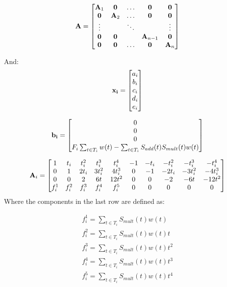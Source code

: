 \documentclass{article}
\begin{document}
\begin{equation*}
    \mathbf{A} = \begin{bmatrix}
        \mathbf{A}_1 & \mathbf{0} & \hdots & \mathbf{0} & \mathbf{0} \\
        \mathbf{0} & \mathbf{A}_2 & \hdots & \mathbf{0} & \mathbf{0} \\
        \vdots & & \ddots & & \vdots \\
        \mathbf{0} & \mathbf{0} & & \mathbf{A}_{n-1} & \mathbf{0} \\
        \mathbf{0} & \mathbf{0} & \hdots & \mathbf{0} & \mathbf{A}_n
    \end{bmatrix}
\end{equation*}

And:
\begin{equation*}
    \mathbf{x_i} = \begin{bmatrix}
        a_i \\
        b_i \\
        c_i \\
        d_i \\
        e_i \\
    \end{bmatrix}
\end{equation*}

\begin{equation*}
    \mathbf{b_i} = \begin{bmatrix}
        0 \\
        0 \\
        0 \\
        F_i \sum_{t \in T_i} w(t) - 
        \sum_{t \in T_i} S_{add}(t)S_{mult}(t)w(t)
    \end{bmatrix}
\end{equation*}

\begin{equation*}
    \mathbf{A}_i = \begin{bmatrix}
        1 & t_i & t_i^2 & t_i^3 & t_i^4 & -1 & -t_i & -t_i^2 & -t_i^3 & -t_i^4 \\
        0 & 1 & 2 t_i & 3 t_i^2 & 4 t_i^3 & 0 & -1 & -2 t_i & -3 t_i^2 & -4 t_i^3 \\
        0 & 0 & 2 & 6 t & 12 t^2 & 0 & 0 & -2 & -6 t & -12 t^2 \\
        f_i^1 & f_i^2 & f_i^3 & f_i^4 & f_i^5 & 0 & 0 & 0 & 0 & 0
    \end{bmatrix}
\end{equation*}
Where the components in the last row are defined as:

\begin{eqnarray}
    \nonumber
    f_i^1 = \sum_{t \in T_i} S_{mult}(t)w(t) \\
    \nonumber
    f_i^2 = \sum_{t \in T_i} S_{mult}(t)w(t) t \\
    \nonumber
    f_i^3 = \sum_{t \in T_i} S_{mult}(t)w(t) t^2 \\
    \nonumber
    f_i^4 = \sum_{t \in T_i} S_{mult}(t)w(t) t^3 \\
    \nonumber
    f_i^5 = \sum_{t \in T_i} S_{mult}(t)w(t) t^4  
\end{eqnarray}
\end{document}

